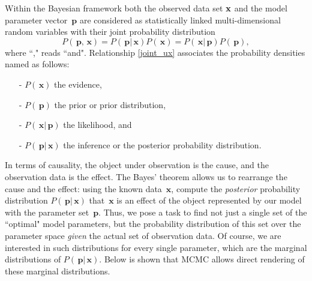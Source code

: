 \documentclass[preprint2]{aastex}
\newcommand{\bfp}{\,\mathbf{p}}
\newcommand{\bfx}{\,\mathbf{x}}
\begin{document}
Within the Bayesian framework both the observed data set $\bf{x}$ and the model parameter vector $\bfp$ are considered as statistically linked multi-dimensional random variables with their joint probability distribution
\begin{equation}
  \label{joint_ux}
  P(\bfp,\bfx) =  P(\bfp|\bfx)P(\bfx) = P(\bfx|\bfp)P(\bfp),
\end{equation}
where ``," reads ``and". Relationship \eqref{joint_ux} associates the probability densities named as follows:
\begin{itemize}
  \item[-] $P(\bfx)$ the evidence,
  \item[-] $P(\bfp)$ the prior or prior distribution,
  \item[-] $P(\bfx|\bfp)$ the likelihood, and
  \item[-] $P(\bfp|\bfx)$ the inference or the posterior probability distribution.
\end{itemize}
In terms of causality, the object under observation is the cause, and the observation data is the effect. The Bayes' theorem allows us to rearrange the cause and the effect: using the known data $\bfx$, compute the \emph{posterior} probability distribution $P(\bfp|\bfx)$ that $\bfx$ is an effect of the object represented by our model with the parameter set $\bfp$. Thus, we pose a task to find not just a single set of the ``optimal" model parameters, but the probability distribution of this set over the parameter space \emph{given} the actual set of observation data. Of course, we are interested in such distributions for every single parameter, which are the marginal distributions of $P(\bfp|\bfx)$. Below is shown that MCMC allows direct rendering of these marginal distributions. 
\end{document}
